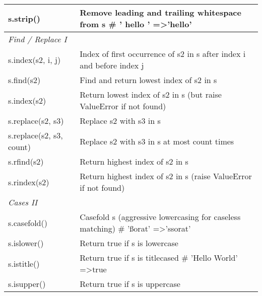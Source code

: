 \documentclass[a4paper,11pt]{book}
\numberwithin{figure}{chapter}
\numberwithin{table}{chapter}
\begin{document}
\begin{appendices}
\begin{table}[!htbp]
\begin{tabular}{lp{12cm}}
s.strip()                & Remove leading and trailing whitespace from s \# ' hello ' =\textgreater 'hello'                                                                \\ \midrule
\textit{Find / Replace I}         &                                                                                                                                                 \\ \midrule
s.index(s2, i, j)        & Index of first occurrence of s2 in s after index i and before index j                                                                           \\
s.find(s2)               & Find and return lowest index of s2 in s                                                                                                         \\
s.index(s2)              & Return lowest index of s2 in s (but raise ValueError if not found)                                                                              \\
s.replace(s2, s3)        & Replace s2 with s3 in s                                                                                                                         \\
s.replace(s2, s3, count) & Replace s2 with s3 in s at most count times                                                                                                     \\
s.rfind(s2)              & Return highest index of s2 in s                                                                                                                 \\
s.rindex(s2)             & Return highest index of s2 in s (raise ValueError if not found)                                                                                 \\ \midrule
\textit{Cases II}                 &                                                                                                                                                 \\ \midrule
s.casefold()             & Casefold s (aggressive lowercasing for caseless matching) \# 'ßorat' =\textgreater 'ssorat'                                                     \\
s.islower()              & Return true if s is lowercase                                                                                                                   \\
s.istitle()              & Return true if s is titlecased \# 'Hello World' =\textgreater true                                                                              \\
s.isupper()              & Return true if s is uppercase                                                                                                                   \\ \midrule                                         
\end{tabular}
\end{table}


\end{appendices}
\end{document}
